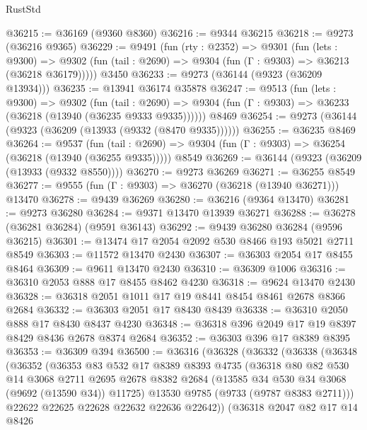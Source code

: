 \begin{lexlean}{RustStd}
\begin{coremodule}
@36215 := @36169 (@9360 @8360)
@36216 := @9344 @36215
@36218 := @9273 (@36216 @9365)
@36229 := @9491
    (fun (rty : @2352) =>
    @9301
      (fun (lets : @9300) =>
      @9302 (fun (tail : @2690) => @9304 (fun (Γ : @9303) => @36213 (@36218 @36179)))))
    @3450
@36233 := @9273 (@36144 (@9323 (@36209 @13934)))
@36235 := @13941 @36174 @35878
@36247 := @9513
    (fun (lets : @9300) =>
    @9302
      (fun (tail : @2690) =>
      @9304 (fun (Γ : @9303) => @36233 (@36218 (@13940 (@36235 @9333 @9335))))))
    @8469
@36254 := @9273 (@36144 (@9323 (@36209 (@13933 (@9332 (@8470 @9335))))))
@36255 := @36235 @8469
@36264 := @9537
    (fun (tail : @2690) => @9304 (fun (Γ : @9303) => @36254 (@36218 (@13940 (@36255 @9335)))))
    @8549
@36269 := @36144 (@9323 (@36209 (@13933 (@9332 @8550))))
@36270 := @9273 @36269
@36271 := @36255 @8549
@36277 := @9555 (fun (Γ : @9303) => @36270 (@36218 (@13940 @36271))) @13470
@36278 := @9439 @36269
@36280 := @36216 (@9364 @13470)
@36281 := @9273 @36280
@36284 := @9371 @13470 @13939 @36271
@36288 := @36278 (@36281 @36284) (@9591 @36143)
@36292 := @9439 @36280 @36284 (@9596 @36215)
@36301 := @13474 @17 @2054 @2092 @530 @8466 @193 @5021 @2711 @8549
@36303 := @11572 @13470 @2430
@36307 := @36303 @2054 @17 @8455 @8464
@36309 := @9611 @13470 @2430
@36310 := @36309 @1006
@36316 := @36310 @2053 @888 @17 @8455 @8462 @4230
@36318 := @9624 @13470 @2430
@36328 := @36318 @2051 @1011 @17 @19 @8441 @8454 @8461 @2678 @8366 @2684
@36332 := @36303 @2051 @17 @8430 @8439
@36338 := @36310 @2050 @888 @17 @8430 @8437 @4230
@36348 := @36318 @396 @2049 @17 @19 @8397 @8429 @8436 @2678 @8374 @2684
@36352 := @36303 @396 @17 @8389 @8395
@36353 := @36309 @394
@36500 := @36316
    (@36328
      (@36332
        (@36338
          (@36348
            (@36352
              (@36353
                @83
                @532
                @17
                @8389
                @8393
                @4735
                (@36318
                  @80
                  @82
                  @530
                  @14
                  @3068
                  @2711
                  @2695
                  @2678
                  @8382
                  @2684
                  (@13585 @34 @530 @34 @3068 (@9692 (@13590 @34)) @11725)
                  @13530
                  @9785
                  (@9733 (@9787 @8383 @2711)))
                @22622
                @22625
                @22628
                @22632
                @22636
                @22642))
            (@36318
              @2047
              @82
              @17
              @14
              @8426

\end{coremodule}
\end{lexlean}
